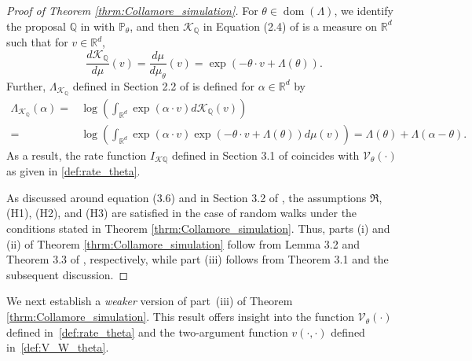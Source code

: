 \documentclass[aap,preprint]{imsart}
\newcommand{\Qro}{\mathbb{Q}}
\newcommand{\Pro}{{\mathbb{P}}}
\newcommand{\bR}{{\mathbb{R}}}
\theoremstyle{plain}
\theoremstyle{definition}
\begin{document}
\begin{appendix}
\begin{proof}[Proof of Theorem \ref{thrm:Collamore_simulation}]
For $\theta \in \operatorname{dom}(\Lambda)$, we identify the proposal $\Qro$ in  \cite{collamore2002} with $\Pro_{\theta}$, and then $\mathcal{K}_{\Qro}$ in Equation (2.4) of \cite{collamore2002} is a measure on $\bR^d$ such that for  $v \in \bR^d$,
$$
\frac{d\mathcal{K}_{\Qro}}{d \mu}(v) = 
\frac{d\mu}{d \mu_{\theta}}(v) =
 \exp\left(- \theta \cdot v + \Lambda(\theta) \right).
$$
Further, $\Lambda_{\mathcal{K}_{\Qro}}$ defined in Section 2.2 of \cite{collamore2002}  is defined for $\alpha \in \mathbb{R}^d$ by
\begin{align*}
    \Lambda_{\mathcal{K}_{\Qro}}(\alpha) = &\log\left(
\int_{\bR^d} \exp(\alpha \cdot v) d\mathcal{K}_{\Qro} (v)
\right) \\
=& \log\left(
\int_{\bR^d} \exp(\alpha \cdot v)  \exp\left(- \theta \cdot v  + \Lambda(\theta) \right) d\mu(v)
\right)  =  \Lambda(\theta) + \Lambda(\alpha - \theta).
\end{align*}
As a result, the rate function $I_{\mathcal{K}{\Qro}}$ defined in Section 3.1 of \cite{collamore2002} coincides with $\mathcal{V}_{\theta}(\cdot)$ as given in \eqref{def:rate_theta}.

As discussed around equation (3.6) and in Section 3.2 of \cite{collamore2002}, the assumptions $\Re$, (H1), (H2), and (H3) are satisfied in the case of random walks under the conditions stated in Theorem \ref{thrm:Collamore_simulation}. Thus, parts (i) and (ii) of Theorem \ref{thrm:Collamore_simulation} follow  from Lemma 3.2 and Theorem 3.3 of \cite{collamore2002}, respectively, while part (iii) follows from Theorem 3.1 and the subsequent discussion.
\end{proof}


We next establish a \textit{weaker} version of part~(iii) of Theorem \ref{thrm:Collamore_simulation}. This result offers insight into the function $\mathcal{V}_{\theta}(\cdot)$ defined in~\eqref{def:rate_theta} and the two-argument function $v(\cdot, \cdot)$ defined in~\eqref{def:V_W_theta}.



\end{appendix}
\end{document}
